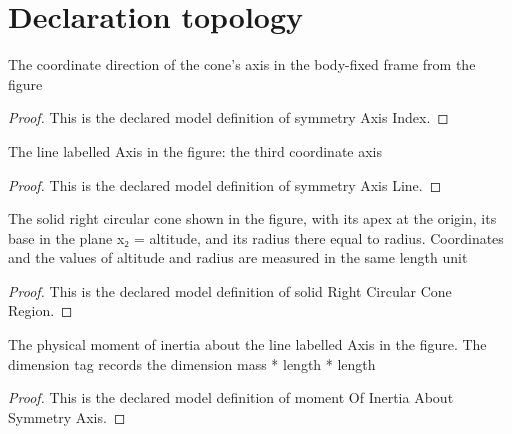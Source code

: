 \section{Declaration topology}
\begin{definition}
  \label{def:physics:phyx-mini-0776:phyxmini0776-symmetryaxisindex}
  The coordinate direction of the cone's axis in the body-fixed frame from the figure
\end{definition}
\begin{proof}
  This is the declared model definition of symmetry Axis Index.
\end{proof}
\begin{definition}
  \label{def:physics:phyx-mini-0776:phyxmini0776-symmetryaxisline}
  The line labelled Axis in the figure: the third coordinate axis
\end{definition}
\begin{proof}
  This is the declared model definition of symmetry Axis Line.
\end{proof}
\begin{definition}
  \label{def:physics:phyx-mini-0776:phyxmini0776-solidrightcircularconeregion}
  The solid right circular cone shown in the figure, with its apex at the origin, its base in the plane x₂ = altitude, and its radius there equal to radius. Coordinates and the values of altitude and radius are measured in the same length unit
\end{definition}
\begin{proof}
  This is the declared model definition of solid Right Circular Cone Region.
\end{proof}
\begin{definition}
  \label{def:physics:phyx-mini-0776:phyxmini0776-momentofinertiaaboutsymmetryaxis}
  The physical moment of inertia about the line labelled Axis in the figure. The dimension tag records the dimension mass * length * length
\end{definition}
\begin{proof}
  This is the declared model definition of moment Of Inertia About Symmetry Axis.
\end{proof}
